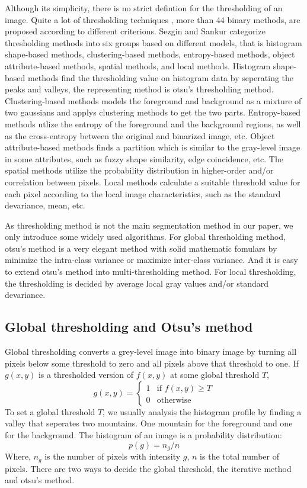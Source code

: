 Although its simplicity, there is no strict defintion for the thresholding of an image. Quite a lot of thresholding techniques \cite{sahoo1988survey, sankur2001image, sezgin2004survey}, more than 44 binary methods, are proposed according to different criterions. Sezgin and Sankur \cite{sankur2001image, sezgin2004survey} categorize thresholding methods into six groups based on different models, that is histogram shape-based methods, clustering-based methods, entropy-based methods, object attribute-based methods, spatial methods, and local methods. Histogram shape-based methods find the thresholding value on histogram data by seperating the peaks and valleys, the representing method is otsu's thresholding method. Clustering-based methods models the foreground and background as a mixture of two gaussians and applys clustering methods to get the two parts. Entropy-based methods utlize the entropy of the foreground and the background regions, as well as the cross-entropy between the original and binarized image, etc. Object attribute-based methods finds a partition which is similar to the gray-level image in some attributes, such as fuzzy shape similarity, edge coincidence, etc. The spatial methods utilize the probability distribution in higher-order and/or correlation between pixels. Local methods calculate a suitable threshold value for each pixel according to the local image characteristics, such as the standard devariance, mean, etc.

As thresholding method is not the main segmentation method in our paper, we only introduce some widely used algorithms. For global thresholding method, otsu's method \cite{otsu1975threshold} is a very elegant method with solid mathematic fomulars by minimize the intra-class variance or maximize inter-class variance. And it is easy to extend otsu's method into multi-thresholding method. For local thresholding, the thresholding is decided by average local gray values and/or standard devariance. 
\subsection{Global thresholding and Otsu's method}
Global thresholding converts a grey-level image into binary image by turning all pixels below some threshold to zero and all pixels above that threshold to one. If $g(x,y)$ is a thresholded version of $f(x,y)$ at some global threshold $T$, 
$$
g(x,y) = \left\{
  \begin{array}{ll}
  1 & \mbox{if } f(x,y) \ge T \\
  0 & \mbox{otherwise}
  \end{array}
  \right.
$$
To set a global threshold $T$, we usually analysis the histogram profile by finding a valley that seperates two mountains. One mountain for the foreground and one for the background. The histogram of an image is a probability distribution:
$$
p(g) = n_g/n
$$
Where, $n_g$ is the number of pixels with intensity $g$, $n$ is the total number of pixels. There are two ways to decide the global threshold, the iterative method and otsu's method. 

